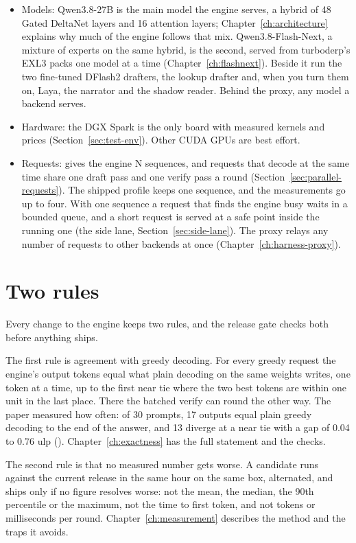 \begin{itemize}
\item Models: Qwen3.8-27B is the main model the engine serves, a hybrid of 48 Gated DeltaNet layers and 16 attention layers; Chapter~\ref{ch:architecture} explains why much of the engine follows that mix. Qwen3.8-Flash-Next, a mixture of experts on the same hybrid, is the second, served from turboderp's EXL3 packs one model at a time (Chapter~\ref{ch:flashnext}). Beside it run the two fine-tuned DFlash2 drafters, the lookup drafter and, when you turn them on, Laya, the narrator and the shadow reader. Behind the proxy, any model a backend serves.
\item Hardware: the DGX Spark is the only board with measured kernels and prices (Section~\ref{sec:test-env}). Other CUDA GPUs are best effort.
\item Requests:  gives the engine N sequences, and requests that decode at the same time share one draft pass and one verify pass a round (Section~\ref{sec:parallel-requests}). The shipped profile keeps one sequence, and the measurements go up to four. With one sequence a request that finds the engine busy waits in a bounded queue, and a short request is served at a safe point inside the running one (the side lane, Section~\ref{sec:side-lane}). The proxy relays any number of requests to other backends at once (Chapter~\ref{ch:harness-proxy}).
\end{itemize}

\section{Two rules}

Every change to the engine keeps two rules, and the release gate checks both before anything ships.

The first rule is agreement with greedy decoding. For every greedy request the engine's output tokens equal what plain decoding on the same weights writes, one token at a time, up to the first near tie where the two best tokens are within one unit in the last place. There the batched verify can round the other way. The paper measured how often: of 30 prompts, 17 outputs equal plain greedy decoding to the end of the answer, and 13 diverge at a near tie with a gap of 0.04 to 0.76 ulp (\measured). Chapter~\ref{ch:exactness} has the full statement and the checks.

The second rule is that no measured number gets worse. A candidate runs against the current release in the same hour on the same box, alternated, and ships only if no figure resolves worse: not the mean, the median, the 90th percentile or the maximum, not the time to first token, and not tokens or milliseconds per round. Chapter~\ref{ch:measurement} describes the method and the traps it avoids.

